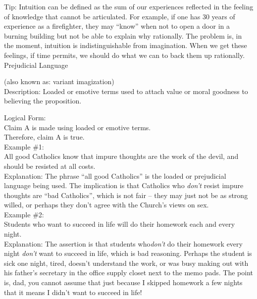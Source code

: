 \documentclass[a4paper,12pt,single,pdftex]{scrartcl}
\begin{document}
    
      Tip: Intuition can be defined as the sum of our experiences reflected in the feeling of knowledge that cannot be articulated. For example, if one has 30 years of experience as a firefighter, they may “know” when not to open a door in a burning building but not be able to explain why rationally. The problem is, in the moment, intuition is indistinguishable from imagination. When we get these feelings, if time permits, we should do what we can to back them up rationally.
    \\

  

Prejudicial Language
    
      (also known as: variant imagization)
    \\

  
    Description: Loaded or emotive terms used to attach value or moral goodness to believing the proposition.

    
      Logical Form:
    \\

    
      Claim A is made using loaded or emotive terms.
    \\

    
      Therefore, claim A is true.
    \\

    
      Example \#1:
    \\

    
      All good Catholics know that impure thoughts are the work of the devil, and should be resisted at all costs.
    \\

    
      Explanation: The phrase “all good Catholics” is the loaded or prejudicial language being used.  The implication is that Catholics who {\it don’t}  resist impure thoughts are “bad Catholics”, which is not fair -- they may just not be as strong willed, or perhaps they don’t agree with the Church's views on sex.
    \\

    
      Example \#2:
    \\

    
      Students who want to succeed in life will do their homework each and every night.
    \\

    
      Explanation: The assertion is that students who{\it  don’t}  do their homework every night {\it don’t} want to succeed in life, which is bad reasoning.  Perhaps the student is sick one night, tired, doesn’t understand the work, or was busy making out with his father’s secretary in the office supply closet next to the memo pads.  The point is, dad, you cannot assume that just because I skipped homework a few nights that it means I didn’t want to succeed in life!
    \\
\end{document}
